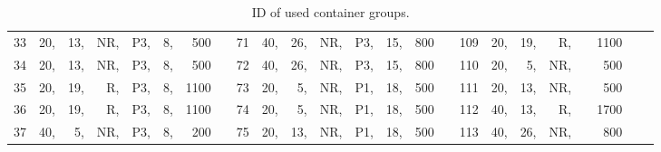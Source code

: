 \begin{table}
\begin{center}
\begin{scriptsize}
\begin{tabular}{*{3}{@{\hskip15pt}r|*{5}{r@{\hskip3pt}}rc}}
  33&20,&13,&NR,&P3,& 8,& 500&  &     71&40,&26,&NR,&P3,&15,& 800&   &    109&20,&19,& R,&&1100\\
  34&20,&13,&NR,&P3,& 8,& 500&  &     72&40,&26,&NR,&P3,&15,& 800&   &    110&20,& 5,&NR,&& 500\\
  35&20,&19,& R,&P3,& 8,&1100&  &     73&20,& 5,&NR,&P1,&18,& 500&   &    111&20,&13,&NR,&& 500\\
  36&20,&19,& R,&P3,& 8,&1100&  &     74&20,& 5,&NR,&P1,&18,& 500&   &    112&40,&13,& R,&&1700\\
  37&40,& 5,&NR,&P3,& 8,& 200&  &     75&20,&13,&NR,&P1,&18,& 500&   &    113&40,&26,&NR,&& 800\\
\end{tabular}
\caption{ID of used container groups.}\label{tab:groupIDs}
\end{scriptsize}
\end{center}
\end{table}

